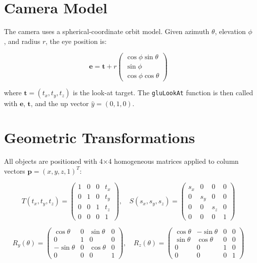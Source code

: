 \documentclass[12pt,a4paper]{report}
\begin{document}
\section{Camera Model}

The camera uses a spherical-coordinate orbit model.  Given azimuth $\theta$, elevation $\phi$, and radius $r$, the eye position is:

\begin{equation}
\mathbf{e} = \mathbf{t} + r \begin{pmatrix} \cos\phi \sin\theta \\ \sin\phi \\ \cos\phi \cos\theta \end{pmatrix}
\label{eq:camera}
\end{equation}

where $\mathbf{t} = (t_x, t_y, t_z)$ is the look-at target.
The \texttt{gluLookAt} function is then called with $\mathbf{e}$, $\mathbf{t}$, and the up vector $\hat{y} = (0,1,0)$.

\section{Geometric Transformations}

All objects are positioned with 4$\times$4 homogeneous matrices applied to column vectors $\mathbf{p}=(x,y,z,1)^T$:

\begin{equation}
T(t_x,t_y,t_z)=\begin{pmatrix}1&0&0&t_x\\0&1&0&t_y\\0&0&1&t_z\\0&0&0&1\end{pmatrix},\quad
S(s_x,s_y,s_z)=\begin{pmatrix}s_x&0&0&0\\0&s_y&0&0\\0&0&s_z&0\\0&0&0&1\end{pmatrix}
\label{eq:ts}
\end{equation}

\begin{equation}
R_y(\theta)=\begin{pmatrix}\cos\theta&0&\sin\theta&0\\0&1&0&0\\-\sin\theta&0&\cos\theta&0\\0&0&0&1\end{pmatrix},\quad
R_z(\theta)=\begin{pmatrix}\cos\theta&-\sin\theta&0&0\\\sin\theta&\cos\theta&0&0\\0&0&1&0\\0&0&0&1\end{pmatrix}
\label{eq:rot}
\end{equation}
\end{document}
